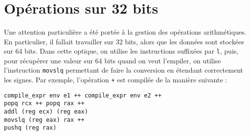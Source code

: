 \documentclass[a4paper,12pt]{article}
\begin{document}
\section{Opérations sur 32 bits}

\paragraph*{}
Une attention particulière a été portée à la gestion des opérations arithmétiques. En particulier, il fallait travailler sur 32 bits, alors que les données
sont stockées sur 64 bits. Dans cette optique, on utilise les instructions suffixées par \texttt{l}, puis, pour récupérer une valeur sur 64 bits quand on
veut l'empiler, on utilise l'instruction \texttt{movslq} permettant de faire la conversion en étendant correctement les signes. Par exemple, l'opération
\texttt{+} est compilée de la manière suivante : 

\begin{lstlisting}
compile_expr env e1 ++ compile_expr env e2 ++
popq rcx ++ popq rax ++
addl (reg ecx) (reg eax)
movslq (reg eax) rax ++
pushq (reg rax)
\end{lstlisting}
\end{document}

